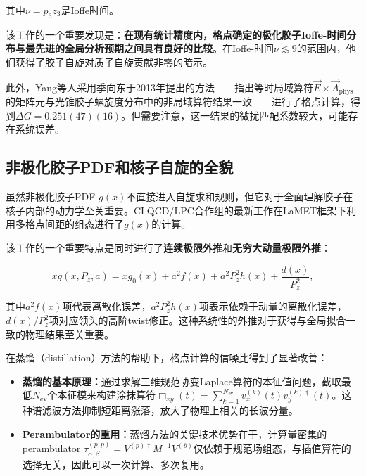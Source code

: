 \documentclass[12pt,a4paper]{ctexart}
\theoremstyle{definition}
\begin{document}
其中$\nu = p_3 z_3$是Ioffe时间。

该工作的一个重要发现是：\textbf{在现有统计精度内，格点确定的极化胶子Ioffe-时间分布与最先进的全局分析预期之间具有良好的比较}。在Ioffe-时间$\nu \lesssim 9$的范围内，他们获得了胶子自旋对质子自旋贡献非零的暗示。

此外，Yang等人\cite{Yang2017}采用季向东于2013年提出的方法\cite{Ji2013gluon}——指出等时局域算符$\vec{E} \times \vec{A}_{\text{phys}}$的矩阵元与光锥胶子螺旋度分布中的非局域算符结果一致——进行了格点计算，得到$\Delta G = 0.251(47)(16)$。但需要注意，这一结果的微扰匹配系数较大，可能存在系统误差。

\subsection{非极化胶子PDF和核子自旋的全貌}

虽然非极化胶子PDF $g(x)$不直接进入自旋求和规则，但它对于全面理解胶子在核子内部的动力学至关重要。CLQCD/LPC合作组的最新工作\cite{Chen2025gluon,Chen2025first,Good2025}在LaMET框架下利用多格点间距的组态进行了$g(x)$的计算。

该工作的一个重要特点是同时进行了\textbf{连续极限外推}和\textbf{无穷大动量极限外推}：

\begin{equation}
xg(x, P_z, a) = xg_0(x) + a^2 f(x) + a^2 P_z^2 h(x) + \frac{d(x)}{P_z^2},
\label{eq:extrap}
\end{equation}

其中$a^2 f(x)$项代表离散化误差，$a^2 P_z^2 h(x)$项表示依赖于动量的离散化误差，$d(x)/P_z^2$项对应领头的高阶twist修正。这种系统性的外推对于获得与全局拟合一致的物理结果至关重要。

在蒸馏（distillation）方法的帮助下，格点计算的信噪比得到了显著改善\cite{Peardon2009,NoteGluonPDFs}：

\begin{itemize}
    \item \textbf{蒸馏的基本原理：}通过求解三维规范协变Laplace算符的本征值问题，截取最低$N_{\text{ev}}$个本征模来构建涂抹算符$\Box_{xy}(t) = \sum_{k=1}^{N_{\text{ev}}} v^{(k)}_x(t) v^{(k)\dagger}_y(t)$。这种谱滤波方法抑制短距离涨落，放大了物理上相关的长波分量。

    \item \textbf{Perambulator的重用：}蒸馏方法的关键技术优势在于，计算量密集的perambulator $\tau^{(p,\bar{p})}_{\alpha,\beta} = V^{(p)\dagger} M^{-1} V^{(\bar{p})}$仅依赖于规范场组态，与插值算符的选择无关，因此可以一次计算、多次复用\cite{NoteGluonPDFs}。
\end{itemize}
\end{document}

